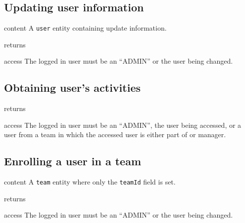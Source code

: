 \subsection{Updating user information}
\label{sec:user:update}

\begin{apidata}{content}
  A \texttt{user} entity containing update information.
\end{apidata}
\begin{apidata}{returns}
  \begin{datalist}
  \end{datalist}
\end{apidata}
\begin{apidata}{access}
The logged in user must be an ``ADMIN'' or the user being changed.
\end{apidata}


\subsection{Obtaining user's activities}

\begin{apidata}{returns}
  \begin{datalist}
  \end{datalist}
\end{apidata}
\begin{apidata}{access}
The logged in user must be an ``ADMIN'', the user being accessed, or a user from
a team in which the accessed user is either part of or manager.
\end{apidata}


\subsection{Enrolling a user in a team}

\begin{apidata}{content}
  A \texttt{team} entity where only the \texttt{teamId} field is set.
\end{apidata}
\begin{apidata}{returns}
  \begin{datalist}
  \end{datalist}
\end{apidata}
\begin{apidata}{access}
The logged in user must be an ``ADMIN'' or the user being changed.
\end{apidata}


